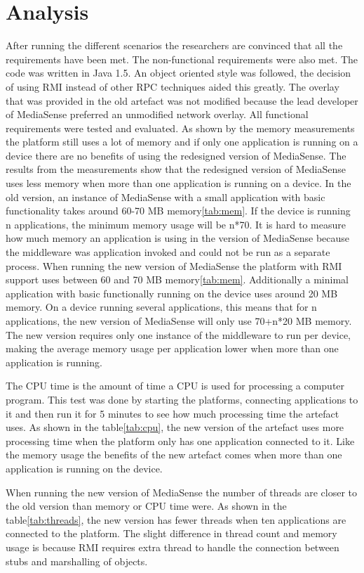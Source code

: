 \section{Analysis}
After running the different scenarios the researchers are convinced that all the requirements have been met. The non-functional requirements were also met. The code was written in Java 1.5. An object oriented style was followed, the decision of using RMI instead of other RPC techniques aided this greatly. The overlay that was provided in the old artefact was not modified because the lead developer of MediaSense preferred an unmodified network overlay. All functional requirements were tested and evaluated. As shown by the memory measurements the platform still uses a lot of memory and if only one application is running on a device there are no benefits of using the redesigned version of MediaSense. The results from the measurements show that the redesigned version of MediaSense uses less memory when more than one application is running on a device. In the old version, an instance of MediaSense with a small application with basic functionality takes around 60-70 MB memory\ref{tab:mem}. If the device is running n applications, the minimum memory usage will be n*70. It is hard to measure how much memory an application is using in the version of MediaSense because the middleware was application invoked and could not be run as a separate process. When running the new version of MediaSense the platform with RMI support uses between 60 and 70 MB memory\ref{tab:mem}. Additionally a minimal application with basic functionally running on the device uses around 20 MB memory. On a device running several applications, this means that for n applications, the new version of MediaSense will only use 70+n*20 MB memory. The new version requires only one instance of the middleware to run per device, making the average memory usage per application lower when more than one application is running.

The CPU time is the amount of time a CPU is used for processing a computer program. This test was done by starting the platforms, connecting applications to it and then run it for 5 minutes to see how much processing time the artefact uses. As shown in the table\ref{tab:cpu}, the new version of the artefact uses more processing time when the platform only has one application connected to it. Like the memory usage the benefits of the new artefact comes when more than one application is running on the device. 

When running the new version of MediaSense the number of threads are closer to the old version than memory or CPU time were. As shown in the table\ref{tab:threads}, the new version has fewer threads when ten applications are connected to the platform. The slight difference in thread count and memory usage is because RMI requires extra thread to handle the connection between stubs and marshalling of objects. 

